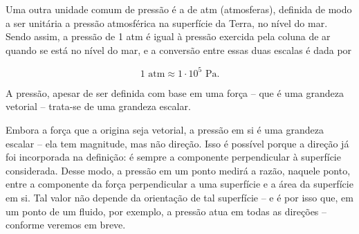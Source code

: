 Uma outra unidade comum de pressão é a de atm (atmosferas), definida de modo a ser unitária a pressão atmosférica na superfície da Terra, no nível do mar. Sendo assim, a pressão de 1 atm é igual à pressão exercida pela coluna de ar quando se está no nível do mar, e a conversão entre essas duas escalas é dada por

$$ \boxed{1 \text{ atm} \approx 1 \cdot 10^5 \text{ Pa.}}$$



A pressão, apesar de ser definida com base em uma força -- que é uma grandeza vetorial -- trata-se de uma grandeza escalar. 


Embora a força que a origina seja vetorial, a pressão em si é uma grandeza escalar -- ela tem magnitude, mas não direção. Isso é possível porque a direção já foi incorporada na definição: é sempre a componente perpendicular à superfície considerada. Desse modo, a pressão em um ponto medirá a razão, naquele ponto, entre a componente da força perpendicular a uma superfície e a área da superfície em si. Tal valor não depende da orientação de tal superfície -- e é por isso que, em um ponto de um fluido, por exemplo, a pressão atua em todas as direções -- conforme veremos em breve.


\vspace{0.3cm}



